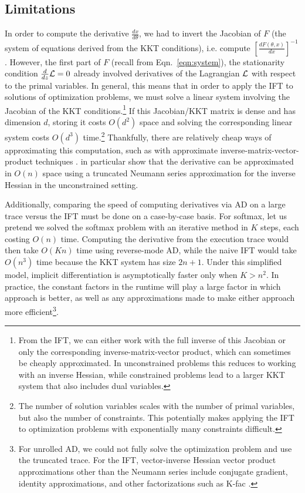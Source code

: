 \documentclass[11pt]{article}
\begin{document}

\subsection{Limitations}
\label{sec:limitations}
In order to compute the derivative $\frac{dx}{d\theta}$, we had to invert the Jacobian of $F$
(the system of equations derived from the KKT conditions),
i.e. compute $\left[\frac{dF(\theta,x)}{dx}\right]^{-1}$.
However, the first part of $F$ (recall from Eqn.~\ref{eqn:system}), the stationarity condition
$\frac{d}{dz}\mathcal{L} = 0$
already involved derivatives of the Lagrangian $\mathcal{L}$ with respect to the primal variables.
In general, this means that in order to apply the IFT to solutions of optimization problems,
we must solve a linear system involving the Jacobian of the KKT conditions.\footnote{
From the IFT, we can either work with the full inverse of this Jacobian
or only the corresponding inverse-matrix-vector product,
which can sometimes be cheaply approximated.
In unconstrained problems this reduces to working with an inverse Hessian,
while constrained problems lead to a larger KKT system that also includes dual variables.
}
If this Jacobian/KKT matrix is dense and has dimension $d$,
storing it costs $O(d^2)$ space
and solving the corresponding linear system costs $O(d^3)$ time.\footnote{
The number of solution variables scales with the number of primal variables,
but also the number of constraints.
This potentially makes applying the IFT to optimization problems with exponentially
many constraints difficult.
}
Thankfully, there are relatively cheap ways of approximating this computation,
such as with approximate inverse-matrix-vector-product techniques
\citep{rajeswaran2019imaml,lorraine2019hoift}.
\citet{lorraine2019hoift} in particular show that the derivative can be approximated
in $O(n)$ space using a truncated Neumann series approximation for the inverse Hessian
in the unconstrained setting.

Additionally, comparing the speed of computing derivatives via AD on a large trace versus the IFT
must be done on a case-by-case basis.
For softmax, let us pretend we solved the softmax problem with an iterative method
in $K$ steps, each costing $O(n)$ time.
Computing the derivative from the execution trace would then take $O(Kn)$ time
using reverse-mode AD,
while the naive IFT would take $O(n^3)$ time because the KKT system has size $2n+1$.
Under this simplified model, implicit differentiation is asymptotically faster
only when $K > n^2$.
In practice, the constant factors in the runtime will play a large factor in which approach
is better, as well as any approximations made to make either approach more efficient\footnote{
For unrolled AD, we could not fully solve the optimization problem and use the truncated trace.
For the IFT, vector-inverse Hessian vector product approximations other than the Neumann series
include conjugate gradient, identity approximations, and other factorizations such as K-fac
\citep{kfac}.
}.
\end{document}

